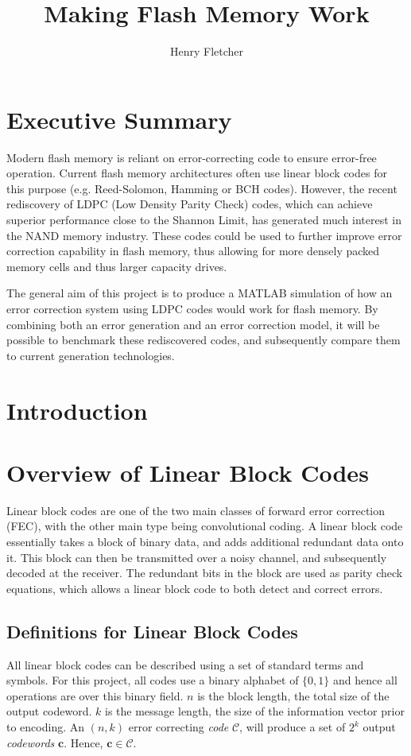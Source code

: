 \documentclass[11pt]{article}
\author{Henry Fletcher}
\title{Making Flash Memory Work}
\numberwithin{equation}{subsection}
\begin{document}
\section{Executive Summary}

Modern flash memory is reliant on error-correcting code to ensure error-free operation. Current flash memory architectures often use linear block codes for this purpose (e.g. Reed-Solomon, Hamming or BCH codes). However, the recent rediscovery of LDPC (Low Density Parity Check) codes, which can achieve superior performance close to the Shannon Limit, has generated much interest in the NAND memory industry. These codes could be used to further improve error correction capability in flash memory, thus allowing for more densely packed memory cells and thus larger capacity drives.

The general aim of this project is to produce a MATLAB simulation of how an error correction system using LDPC codes would work for flash memory.  By combining both an error generation and an error correction model, it will be possible to benchmark these rediscovered codes, and subsequently compare them to current generation technologies.

\tableofcontents

\section{Introduction}

\section{Overview of Linear Block Codes}

Linear block codes are one of the two main classes of forward error correction (FEC), with the other main type being convolutional coding. A linear block code essentially takes a block of binary data, and adds additional redundant data onto it. This block can then be transmitted over a noisy channel, and subsequently decoded at the receiver. The redundant bits in the block are used as parity check equations, which allows a linear block code to both detect and correct errors. 

\subsection{Definitions for Linear Block Codes} \label{3.1:definitions}
All linear block codes can be described using a set of standard terms and symbols. For this project, all codes use a binary alphabet of $\{0,1\}$ and hence all operations are over this binary field. $n$ is the block length, the total size of the output codeword. $k$ is the message length, the size of the information vector prior to encoding. An $(n,k)$ error correcting \textit{code} $\mathcal{C}$, will produce a set of $2^k$ output \textit{codewords} $\mathbf{c}$. Hence, $\mathbf{c} \in \mathcal{C}$. 
\end{document}
